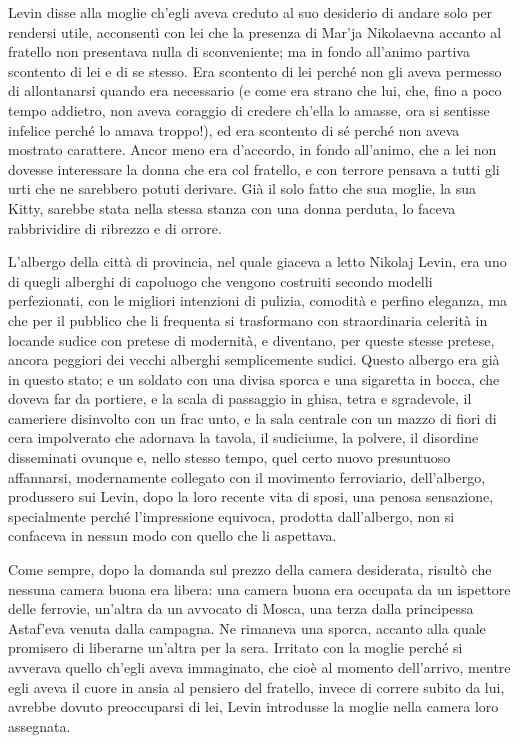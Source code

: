Levin disse alla moglie ch'egli aveva creduto al suo desiderio di andare solo per rendersi utile, acconsentì con lei che la presenza di Mar'ja Nikolaevna accanto al fratello non presentava nulla di sconveniente; ma in fondo all'animo partiva scontento di lei e di se stesso. Era scontento di lei perché non gli aveva permesso di allontanarsi quando era necessario (e come era strano che lui, che, fino a poco tempo addietro, non aveva coraggio di credere ch'ella lo amasse, ora si sentisse infelice perché lo amava troppo!), ed era scontento di sé perché non aveva mostrato carattere. Ancor meno era d'accordo, in fondo all'animo, che a lei non dovesse interessare la donna che era col fratello, e con terrore pensava a tutti gli urti che ne sarebbero potuti derivare. Già il solo fatto che sua moglie, la sua Kitty, sarebbe stata nella stessa stanza con una donna perduta, lo faceva rabbrividire di ribrezzo e di orrore. 

L'albergo della città di provincia, nel quale giaceva a letto Nikolaj Levin, era uno di quegli alberghi di capoluogo che vengono costruiti secondo modelli perfezionati, con le migliori intenzioni di pulizia, comodità e perfino eleganza, ma che per il pubblico che li frequenta si trasformano con straordinaria celerità in locande sudice con pretese di modernità, e diventano, per queste stesse pretese, ancora peggiori dei vecchi alberghi semplicemente sudici. Questo albergo era già in questo stato; e un soldato con una divisa sporca e una sigaretta in bocca, che doveva far da portiere, e la scala di passaggio in ghisa, tetra e sgradevole, il cameriere disinvolto con un frac unto, e la sala centrale con un mazzo di fiori di cera impolverato che adornava la tavola, il sudiciume, la polvere, il disordine disseminati ovunque e, nello stesso tempo, quel certo nuovo presuntuoso affannarsi, modernamente collegato con il movimento ferroviario, dell'albergo, produssero sui Levin, dopo la loro recente vita di sposi, una penosa sensazione, specialmente perché l'impressione equivoca, prodotta dall'albergo, non si confaceva in nessun modo con quello che li aspettava. 

Come sempre, dopo la domanda sul prezzo della camera desiderata, risultò che nessuna camera buona era libera: una camera buona era occupata da un ispettore delle ferrovie, un'altra da un avvocato di Mosca, una terza dalla principessa Astaf'eva venuta dalla campagna. Ne rimaneva una sporca, accanto alla quale promisero di liberarne un'altra per la sera. Irritato con la moglie perché si avverava quello ch'egli aveva immaginato, che cioè al momento dell'arrivo, mentre egli aveva il cuore in ansia al pensiero del fratello, invece di correre subito da lui, avrebbe dovuto preoccuparsi di lei, Levin introdusse la moglie nella camera loro assegnata. 

